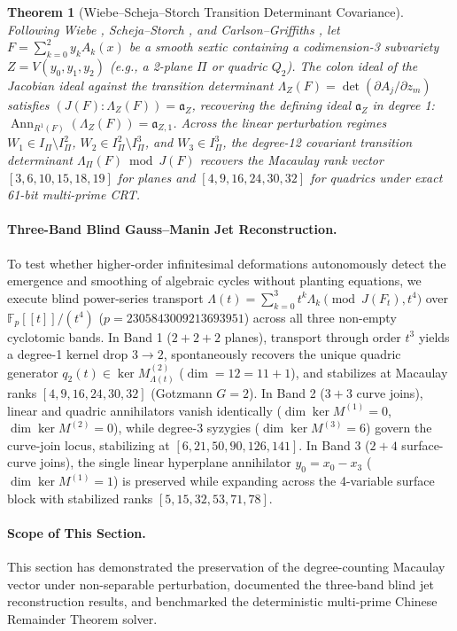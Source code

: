 \documentclass[11pt,a4paper]{amsart}
\newtheorem{theorem}{Theorem}[section]
\theoremstyle{definition}
\theoremstyle{remark}
\DeclareMathOperator{\Ann}{Ann}
\begin{document}
\begin{theorem}[Wiebe--Scheja--Storch Transition Determinant Covariance]
\label{thm:wiebe_covariance_journal}
Following Wiebe \cite{Wiebe1969}, Scheja--Storch \cite{SchejaStorch1975}, and Carlson--Griffiths \cite{CarlsonGriffiths1980}, let $F = \sum_{k=0}^2 y_k A_k(x)$ be a smooth sextic containing a codimension-3 subvariety $Z = V(y_0, y_1, y_2)$ (e.g., a 2-plane $\Pi$ or quadric $Q_2$). The colon ideal of the Jacobian ideal against the transition determinant $\Lambda_Z(F) = \det(\partial A_j / \partial z_m)$ satisfies $(J(F) : \Lambda_Z(F)) = \mathfrak{a}_Z$, recovering the defining ideal $\mathfrak{a}_Z$ in degree 1: $\Ann_{R^1(F)}(\Lambda_Z(F)) = \mathfrak{a}_{Z, 1}$. Across the linear perturbation regimes $W_1 \in I_\Pi \setminus I_\Pi^2$, $W_2 \in I_\Pi^2 \setminus I_\Pi^3$, and $W_3 \in I_\Pi^3$, the degree-12 covariant transition determinant $\Lambda_\Pi(F) \bmod J(F)$ recovers the Macaulay rank vector $[3, 6, 10, 15, 18, 19]$ for planes and $[4, 9, 16, 24, 30, 32]$ for quadrics under exact 61-bit multi-prime CRT.
\end{theorem}

\paragraph{Three-Band Blind Gauss--Manin Jet Reconstruction.}
To test whether higher-order infinitesimal deformations autonomously detect the emergence and smoothing of algebraic cycles without planting equations, we execute blind power-series transport $\Lambda(t) = \sum_{k=0}^3 t^k \Lambda_k \pmod{J(F_t), t^4}$ over $\mathbb{F}_p[[t]]/(t^4)$ ($p = 2305843009213693951$) across all three non-empty cyclotomic bands. In Band 1 ($2+2+2$ planes), transport through order $t^3$ yields a degree-1 kernel drop $3 \to 2$, spontaneously recovers the unique quadric generator $q_2(t) \in \ker M^{(2)}_{\Lambda(t)}$ ($\dim = 12 = 11 + 1$), and stabilizes at Macaulay ranks $[4, 9, 16, 24, 30, 32]$ (Gotzmann $G=2$). In Band 2 ($3+3$ curve joins), linear and quadric annihilators vanish identically ($\dim \ker M^{(1)} = 0$, $\dim \ker M^{(2)} = 0$), while degree-3 syzygies ($\dim \ker M^{(3)} = 6$) govern the curve-join locus, stabilizing at $[6, 21, 50, 90, 126, 141]$. In Band 3 ($2+4$ surface-curve joins), the single linear hyperplane annihilator $y_0 = x_0 - x_3$ ($\dim \ker M^{(1)} = 1$) is preserved while expanding across the 4-variable surface block with stabilized ranks $[5, 15, 32, 53, 71, 78]$.

\paragraph{Scope of This Section.}
This section has demonstrated the preservation of the degree-counting Macaulay vector under non-separable perturbation, documented the three-band blind jet reconstruction results, and benchmarked the deterministic multi-prime Chinese Remainder Theorem solver.
\end{document}

